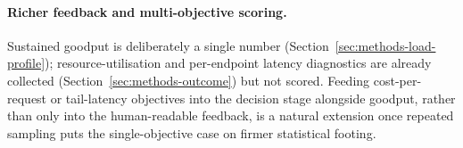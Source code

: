 \paragraph{Richer feedback and multi-objective scoring.} Sustained
goodput is deliberately a single number
(Section~\ref{sec:methods-load-profile}); resource-utilisation and
per-endpoint latency diagnostics are already collected
(Section~\ref{sec:methods-outcome}) but not scored. Feeding
cost-per-request or tail-latency objectives into the decision stage
alongside goodput, rather than only into the human-readable feedback, is
a natural extension once repeated sampling puts the single-objective case
on firmer statistical footing.
